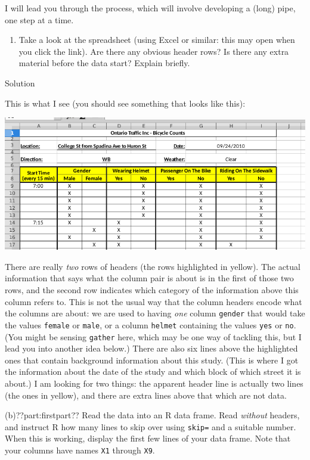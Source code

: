 \documentclass[]{tufte-book}
\providecommand{\tightlist}{%
  \setlength{\itemsep}{0pt}\setlength{\parskip}{0pt}}
\theoremstyle{definition}
\theoremstyle{definition}
\theoremstyle{definition}
\theoremstyle{remark}
\begin{document}
I will lead you through the process, which will involve developing a
(long) pipe, one step at a time.

\begin{enumerate}
\def\labelenumi{(\alph{enumi})}
\tightlist
\item
  Take a look at the spreadsheet (using Excel or similar: this may open
  when you click the link). Are there any obvious header rows? Is there
  any extra material before the data start? Explain briefly.
\end{enumerate}

Solution

This is what I see (you should see something that looks like this):

\includegraphics{bikes-ss.png}

There are really \emph{two} rows of headers (the rows highlighted in
yellow). The actual information that says what the column pair is about
is in the first of those two rows, and the second row indicates which
category of the information above this column refers to. This is not the
usual way that the column headers encode what the columns are about: we
are used to having \emph{one} column \texttt{gender} that would take the
values \texttt{female} or \texttt{male}, or a column \texttt{helmet}
containing the values \texttt{yes} or \texttt{no}. (You might be sensing
\texttt{gather} here, which may be one way of tackling this, but I lead
you into another idea below.) There are also six lines above the
highlighted ones that contain background information about this study.
(This is where I got the information about the date of the study and
which block of which street it is about.) I am looking for two things:
the apparent header line is actually two lines (the ones in yellow), and
there are extra lines above that which are not data.

(b)??part:firstpart?? Read the data into an R data frame. Read
\emph{without} headers, and instruct R how many lines to skip over using
\texttt{skip=} and a suitable number. When this is working, display the
first few lines of your data frame. Note that your columns have names
\texttt{X1} through \texttt{X9}.
\end{document}

